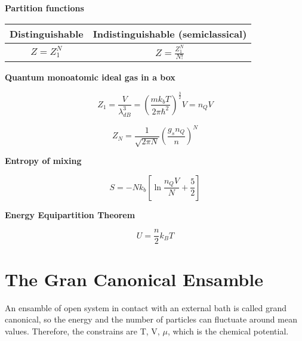 \documentclass{article}
\begin{document}
\begin{tcolorbox}[colframe=gray!90, colback=gray!5, coltitle=white, sharp corners, title=\textbf{Ideal Gas, Summary}, fonttitle=\large\bfseries]
    \textbf{Partition functions}


    \renewcommand{\arraystretch}{1.5}
    \begin{center}
        \begin{tabular}{|c|c|}
            \hline
            \textbf{Distinguishable} & \textbf{Indistinguishable (semiclassical)} \\ \hline
            \( Z = Z_1^N \)          & \( Z = \frac{Z_1^N}{N!} \)                 \\ \hline
        \end{tabular}

    \end{center}


    \textbf{Quantum monoatomic ideal gas in a box}

    \begin{equation}
        Z_1 = \frac{V}{\lambda_{dB}^3}= \left( \frac{mk_bT}{2\pi\hbar^2} \right)^{\frac{3}{2}}V= n_QV
    \end{equation}

    \begin{equation}
        Z_N = \frac{1}{\sqrt{2\pi N}}\left( \frac{g_s n_Q}{n} \right)^N
    \end{equation}

    \textbf{Entropy of mixing}

    \begin{equation}
        S = -Nk_b\left[ \ln{\frac{n_QV}{N}} + \frac{5}{2} \right]
    \end{equation}

    \textbf{Energy Equipartition Theorem}

    \begin{equation}
        U = \frac{n}{2}k_BT
    \end{equation}

\end{tcolorbox}

\newpage


\section{The Gran Canonical Ensamble}

An ensamble of open system in contact with an external bath is called grand canonical,
so the energy and the number of particles can fluctuate around mean values.
Therefore, the constrains are T, V, $\mu$, which is the chemical potential.
\end{document}
